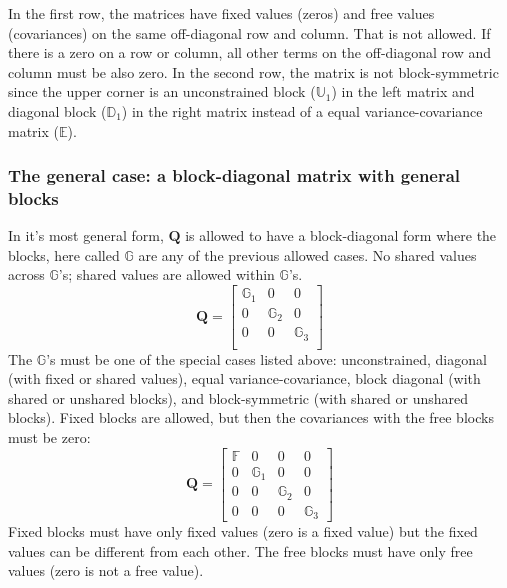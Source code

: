 \documentclass[]{article}
\def\QQ{\mbox{$\mathbf Q$}}	 \def\qq{\mbox{$\mathbf q$}} \def\Qb{\mbox{$\mathbf G$}}  \def\Qm{\mathbb{Q}}
\begin{document}
In the first row, the matrices have fixed values (zeros) and free values (covariances) on the same off-diagonal row and column.  That is not allowed.  If there is a zero on a row or column, all other terms on the off-diagonal row and column must be also zero.  In the second row, the matrix is not block-symmetric since the upper corner is an unconstrained block ($\mathbb{U}_1$) in the left matrix and diagonal block ($\mathbb{D}_1$) in the right matrix  instead of a equal variance-covariance matrix ($\mathbb{E}$).

\subsubsection{The general case: a block-diagonal matrix with general blocks}
\label{sec:Q.general}
In it's most general form, $\QQ$ is allowed to have a block-diagonal form where the blocks, here called $\mathbb{G}$ are any of the previous allowed cases.  No shared values across $\mathbb{G}$'s; shared values are allowed within $\mathbb{G}$'s.
\begin{equation*}
\QQ=
\begin{bmatrix}
\mathbb{G}_1&0&0\\
0&\mathbb{G}_2&0\\
0&0&\mathbb{G}_3\\
\end{bmatrix}
\end{equation*}
The $\mathbb{G}$'s must be one of the special cases listed above: unconstrained, diagonal (with fixed or shared values), equal variance-covariance, block diagonal (with shared or unshared blocks), and block-symmetric (with shared or unshared blocks).  Fixed blocks are allowed, but then the covariances with the free blocks must be zero:
\begin{equation*}
\QQ=
\begin{bmatrix}
\mathbb{F}&0&0&0\\
0&\mathbb{G}_1&0&0\\
0&0&\mathbb{G}_2&0\\
0&0&0&\mathbb{G}_3
\end{bmatrix}
\end{equation*}
Fixed blocks must have only fixed values (zero is a fixed value) but the fixed values can be different from each other.  The free blocks must have only free values (zero is not a free value).  
\end{document}
